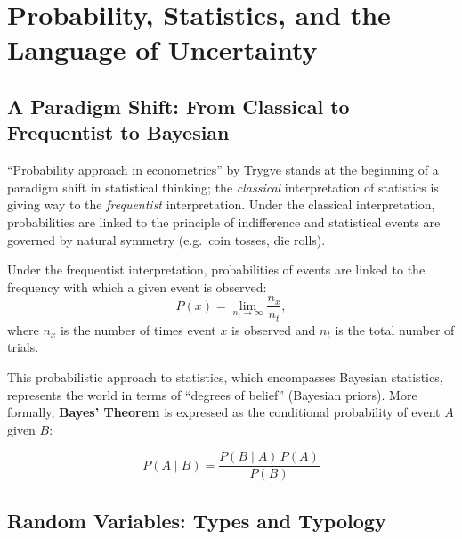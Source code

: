 
\chapter{Probability, Statistics, and the Language of Uncertainty}
\label{chap_Review}

\section{A Paradigm Shift: From Classical to Frequentist to Bayesian}
\label{sec_paradigm}

``Probability approach in econometrics'' by Trygve \citet{Haavelmo1944} stands
at the beginning of a paradigm shift in statistical thinking; the
\emph{classical} interpretation of statistics is giving way to the
\emph{frequentist} interpretation. Under the classical interpretation,
probabilities are linked to the principle of indifference and statistical
events are governed by natural symmetry (e.g.\ coin tosses, die rolls).

Under the frequentist interpretation, probabilities of events are linked to
the frequency with which a given event is observed:
\begin{equation}
  P(x) = \lim_{n_t \to \infty} \frac{n_x}{n_t},
\end{equation}
where $n_x$ is the number of times event $x$ is observed and $n_t$ is the
total number of trials.

This probabilistic approach to statistics, which encompasses Bayesian
statistics, represents the world in terms of
``degrees of belief'' (Bayesian priors). More formally, \textbf{Bayes'
Theorem} is expressed as the conditional probability of
event $A$ given $B$:

\begin{tcolorbox}[keyresult]
\begin{equation}
  P(A \mid B) = \frac{P(B \mid A)\,P(A)}{P(B)}
\end{equation}
\end{tcolorbox}


\section{Random Variables: Types and Typology}
\label{sec_RVtypes}

